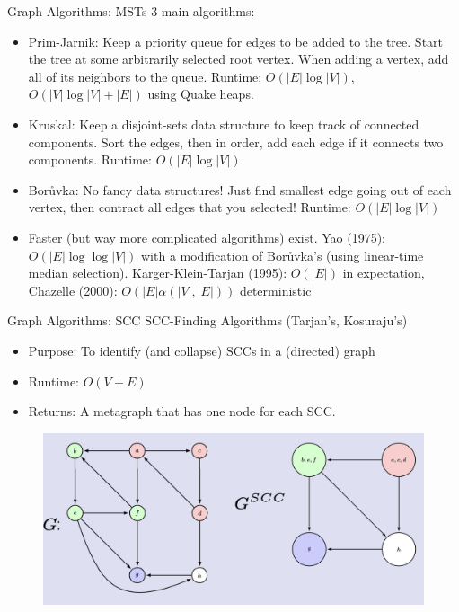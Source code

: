 \documentclass{beamer}
\begin{document}
 \begin{frame}[t]{Graph Algorithms: MSTs}
   3 main algorithms:
   \begin{itemize}
       \item \alert{Prim-Jarnik}: Keep a priority queue for edges to be added to the tree. Start the tree at some arbitrarily selected root vertex. When adding a vertex, add all of its neighbors to the queue. Runtime: $O(|E| \log |V|)$, $O(|V| \log |V| + |E|)$ using Quake heaps.
       \item \pause \alert{Kruskal}: Keep a disjoint-sets data structure to keep track of connected components. Sort the edges, then in order, add each edge if it connects two components. Runtime: $O(|E| \log |V|)$.
       \item \pause \alert{Bor\r{u}vka}: No fancy data structures! Just find smallest edge going out of each vertex, then contract all edges that you selected! Runtime: $O(|E| \log |V|)$
       \item \pause Faster (but way more complicated algorithms) exist. \alert{Yao} (1975): $O(|E| \log \log |V|)$ with a modification of Bor\r{u}vka's (using linear-time median selection). \alert{Karger-Klein-Tarjan} (1995): $O(|E|)$ in expectation, \alert{Chazelle} (2000): $O(|E| \alpha(|V|, |E|))$ deterministic
   \end{itemize}
 \end{frame}

\begin{frame}[t]{Graph Algorithms: SCC}
  \alert{SCC-Finding Algorithms (Tarjan's, Kosuraju's)}
  \begin{itemize}
      \item \alert{Purpose:} To identify (and collapse) SCCs in a (directed) graph
      \item \alert{Runtime:} $O(V + E)$
      \item \alert{Returns:} A metagraph that has one node for each SCC.
  \end{itemize}
  \begin{figure}
      \centering
      \includegraphics[width=0.5\linewidth]{SCC.png}
  \end{figure}
\end{frame}
\end{document}
